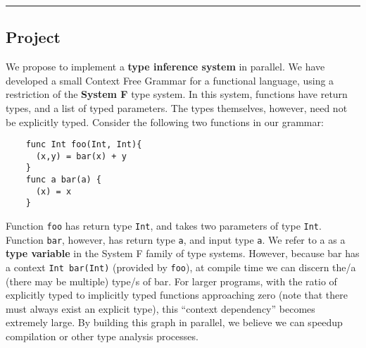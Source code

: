 \documentclass{article}[9pt]
\newenvironment{Figure}
  {\par\medskip\noindent\minipage{\linewidth}}
  {\endminipage\par\medskip}
\begin{document}
\thispagestyle{empty}
\noindent{}
\noindent{}

\vspace{1em}

\noindent{}
\rule{\textwidth}{1pt}

\begin{multicols}{2}

\section*{Project}
We propose to implement a \textbf{type inference system} in parallel. We have
developed a small Context Free Grammar for a functional language,
using a restriction of the \textbf{System F} type system. In this system,
functions have return types, and a list of typed parameters. The types
themselves, however, need not be explicitly typed. Consider the
following two functions in our grammar:
\begin{Figure}
  \begin{lstlisting}
    func Int foo(Int, Int){
      (x,y) = bar(x) + y
    }
    func a bar(a) {
      (x) = x
    }
  \end{lstlisting}
\end{Figure}
\noindent Function \texttt{foo} has return type \texttt{Int}, and takes two parameters of type
\texttt{Int}. Function \texttt{bar}, however, has return type \texttt{a}, and input type \texttt{a}. We
refer to a as a \textbf{type variable} in the System F family of type
systems. However, because bar has a context \texttt{Int bar(Int)} (provided
by \texttt{foo}), at compile time we can discern the/a  (there may be multiple)
type/s of bar. For larger programs, with the ratio of explicitly typed
to implicitly typed functions approaching zero (note that there must
always exist an explicit type), this ``context dependency'' becomes
extremely large. By building this graph in parallel, we believe we can
speedup compilation or other type analysis processes.


\end{multicols}
\end{document}
